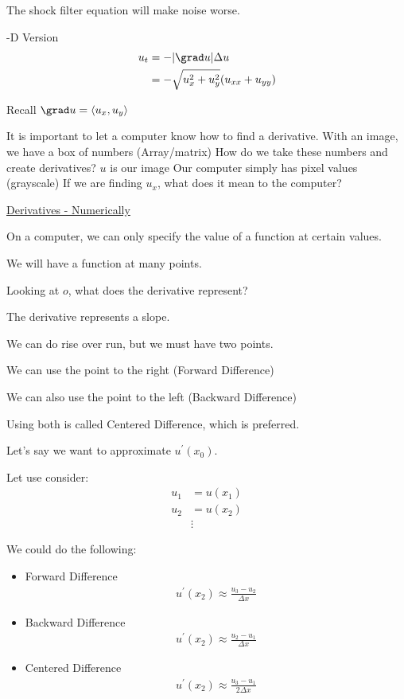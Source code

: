 \note The shock filter equation will make noise worse.

-D Version
%
\begin{align}
  u_t & = - | \grad u | \Delta u\\
  & = - \sqrt{u^2_x + u^2_y} (u_{xx} + u_{yy})
\end{align}

Recall $\grad u = \left< u_x, u_y \right>$



It is important to let a computer know how to find a derivative.
With an image, we have a box of numbers (Array/matrix)
How do we take these numbers and create derivatives?
$u$ is our image
Our computer simply has pixel values (grayscale)
If we are finding $u_x$, what does it mean to the computer?

\underline{Derivatives - Numerically}

On a computer, we can only specify the value of a function at certain values.


We will have a function at many points.

Looking at $o$, what does the derivative represent?

The derivative represents a slope.

We can do rise over run, but we must have two points.

We can use the point to the right (Forward Difference)

We can also use the point to the left (Backward Difference)

Using both is called Centered Difference, which is preferred.


Let's say we want to approximate $u^\prime(x_0)$.

Let use consider:
%
\begin{align}
  u_1 & = u(x_1)\\
  u_2 & = u(x_2)\\
  & \vdots
\end{align}

We could do the following:
%
\begin{itemize}
  \item Forward Difference
  \begin{align}
    u^\prime(x_2) \approx \frac{u_3 - u_2}{\Delta x}
  \end{align}
  \item Backward Difference
  \begin{align}
    u^\prime(x_2) \approx \frac{u_2 - u_1}{\Delta x}
  \end{align}
  \item Centered Difference
  \begin{align}
    u^\prime(x_2) \approx \frac{u_3 - u_1}{2 \Delta x}
  \end{align}
\end{itemize}

